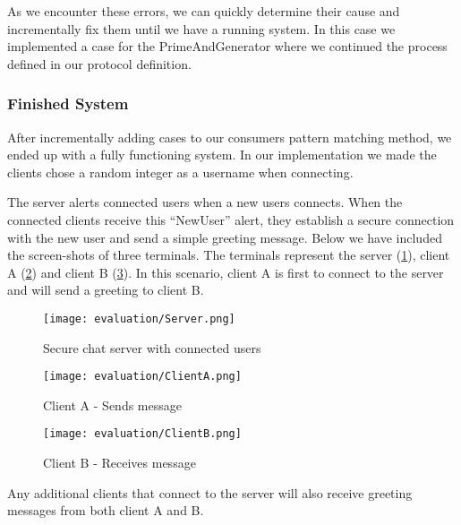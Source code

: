 As we encounter these errors, we can quickly determine their cause and incrementally fix them until we have a running system. In this case we implemented a case for the PrimeAndGenerator where we continued the process defined in our protocol definition.

\subsubsection{Finished System}
After incrementally adding cases to our consumers pattern matching method, we ended up with a fully functioning system. In our implementation we made the clients chose a random integer as a username when connecting. 

The server alerts connected users when a new users connects. When the connected clients receive this ``NewUser'' alert, they establish a secure connection with the new user and send a simple greeting message. Below we have included the screen-shots of three terminals. The terminals represent the server (\ref{fig:server}), client A (\ref{fig:clienta}) and client B (\ref{fig:clientb}). In this scenario, client A is first to connect to the server and will send a greeting to client B.

\begin{figure}[H]
  \centering
  \texttt{[image: evaluation/Server.png]}
  \caption{Secure chat server with connected users}
  \label{fig:server}
\end{figure}

\begin{figure}[H]
  \centering
  \texttt{[image: evaluation/ClientA.png]}
  \caption{Client A - Sends message}
  \label{fig:clienta}
\end{figure}

\begin{figure}[H]
  \centering
  \texttt{[image: evaluation/ClientB.png]}
  \caption{Client B - Receives message}
  \label{fig:clientb}
\end{figure}

Any additional clients that connect to the server will also receive greeting messages from both client A and B.




